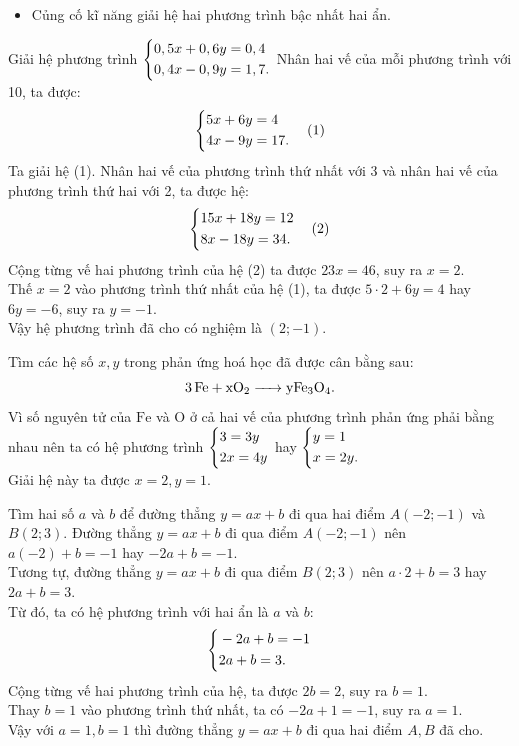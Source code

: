 \begin{itemize}
	\item Củng cố kĩ năng giải hệ hai phương trình bậc nhất hai ẩn.
\end{itemize}

\noidungsanpham

\begin{vidu}
	Giải hệ phương trình $\left\{\begin{aligned}&0,5x + 0,6y = 0,4 \\ &0,4x - 0,9y = 1,7.\end{aligned}\right.$
	\doicot
	Nhân hai vế của mỗi phương trình với 10, ta được:
	$$\left\{\begin{aligned}&5x + 6y = 4 \\ &4x - 9y = 17.\end{aligned}\right. \quad (1)$$
	Ta giải hệ (1). Nhân hai vế của phương trình thứ nhất với 3 và nhân hai vế của phương trình thứ hai với 2, ta được hệ:
	$$\left\{\begin{aligned}&15x + 18y = 12 \\ &8x - 18y = 34.\end{aligned}\right. \quad (2)$$
	Cộng từng vế hai phương trình của hệ (2) ta được $23x = 46$, suy ra $x = 2$.\\
	Thế $x = 2$ vào phương trình thứ nhất của hệ (1), ta được $5 \cdot 2 + 6y = 4$ hay $6y = -6$, suy ra $y = -1$.\\
	Vậy hệ phương trình đã cho có nghiệm là $(2; -1)$.
\end{vidu}

\begin{vidu}
	Tìm các hệ số $x, y$ trong phản ứng hoá học đã được cân bằng sau:
	$$\ce{3Fe + xO2 -> yFe3O4}.$$
	\doicot
	Vì số nguyên tử của $\text{Fe}$ và $\text{O}$ ở cả hai vế của phương trình phản ứng phải bằng nhau nên ta có hệ phương trình $\left\{\begin{aligned}&3 = 3y \\ &2x = 4y\end{aligned}\right.$ hay $\left\{\begin{aligned}&y = 1 \\ &x = 2y.\end{aligned}\right.$\\
	Giải hệ này ta được $x = 2, y = 1$.
\end{vidu}

\begin{vidu}
	Tìm hai số $a$ và $b$ để đường thẳng $y = ax + b$ đi qua hai điểm $A(-2; -1)$ và $B(2; 3)$.
	\doicot
	Đường thẳng $y = ax + b$ đi qua điểm $A(-2; -1)$ nên $a(-2) + b = -1$ hay $-2a + b = -1$.\\
	Tương tự, đường thẳng $y = ax + b$ đi qua điểm $B(2; 3)$ nên $a \cdot 2 + b = 3$ hay $2a + b = 3$.\\
	Từ đó, ta có hệ phương trình với hai ẩn là $a$ và $b$:
	$$\left\{\begin{aligned}&-2a + b = -1 \\ &2a + b = 3.\end{aligned}\right.$$
	Cộng từng vế hai phương trình của hệ, ta được $2b = 2$, suy ra $b = 1$.\\
	Thay $b = 1$ vào phương trình thứ nhất, ta có $-2a + 1 = -1$, suy ra $a = 1$.\\
	Vậy với $a = 1, b = 1$ thì đường thẳng $y = ax + b$ đi qua hai điểm $A, B$ đã cho.
\end{vidu}

